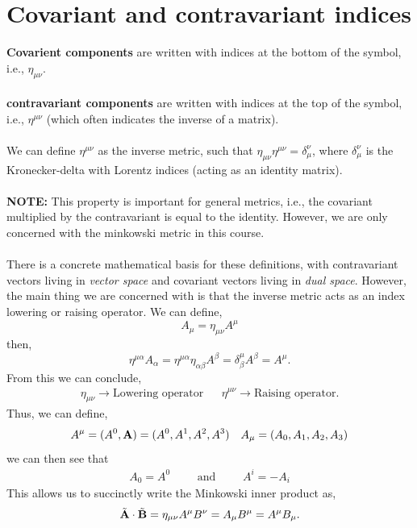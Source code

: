 \documentclass{book}
\begin{document}
\section{Covariant and contravariant indices}
\textbf{Covarient components} are written with indices at the bottom of the symbol, i.e., $\eta_{\mu\nu}$. 
\\\\
\textbf{contravariant components} are written with indices at the top of the symbol, i.e., $\eta^{\mu\nu}$ (which often indicates the inverse of a matrix). 
\\\\
We can define $\eta^{\mu\nu}$ as the inverse metric, such that $\eta_{\mu\nu}\eta^{\mu\nu} = \delta_{\mu}^{\nu}$, where $\delta_{\mu}^{\nu}$ is the Kronecker-delta with Lorentz indices (acting as an identity matrix).
\\\\
\textbf{NOTE:} This property is important for general metrics, i.e., the covariant multiplied by the contravariant is equal to the identity. However, we are only concerned with the minkowski metric in this course.
\\\\
There is a concrete mathematical basis for these definitions, with contravariant vectors living in \textit{vector space} and covariant vectors living in \textit{dual space}. However, the main thing we are concerned with is that the inverse metric acts as an index lowering or raising operator. We can define,
\begin{equation}
	A_{\mu} = \eta_{\mu\nu}A^{\mu}
\end{equation}
then,
\begin{equation}
	\eta^{\mu\alpha}A_{\alpha} = \eta^{\mu\alpha}\eta_{\alpha\beta}A^{\beta} = \delta_{\beta}^{\mu}A^{\beta} = A^{\mu}.
\end{equation}
From this we can conclude,
\begin{align}
	\eta_{\mu\nu} \to \text{Lowering operator} && \eta^{\mu\nu} \to \text{Raising operator}.
\end{align}
Thus, we can define,
\begin{align}
	A^{\mu}=(A^{0},\vb{A}) = (A^0, A^1, A^2, A^3) && A_{\mu} = (A_0, A_1, A_2, A_3)
\end{align}
we can then see that
\begin{align}
	A_0 = A^0&&&\text{and}&&&A^i = -A_i
\end{align} 
This allows us to succinctly write the Minkowski inner product as,
\begin{equation}
	\tilde{\vb{A}}\cdot\tilde{\vb{B}} = \eta_{\mu\nu}A^{\mu}B^{\nu}=A_{\mu}B^{\mu} = A^{\mu}B_{\mu}.
\end{equation}
\end{document}

